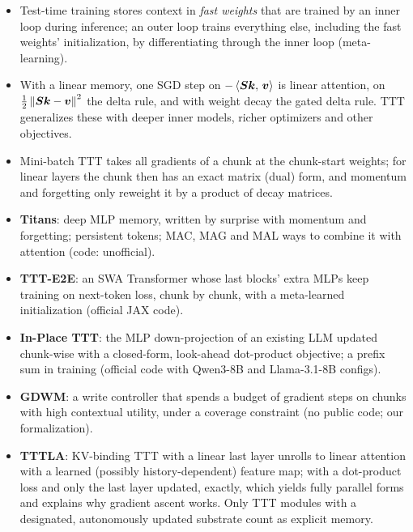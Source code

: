 \begin{summarybox}
\begin{itemize}
  \item Test-time training stores context in \emph{fast weights} that are trained by an inner
        loop during inference; an outer loop trains everything else, including the fast weights'
        initialization, by differentiating through the inner loop (meta-learning).
  \item With a linear memory, one SGD step on $-\left\langle \bm{S}\bm{k},\, \bm{v}\right\rangle$ is linear attention, on
        $\frac12\left\lVert \bm{S}\bm{k}-\bm{v}\right\rVert^2$ the delta rule, and with weight decay the gated delta rule.
        TTT generalizes these with deeper inner models, richer optimizers and other objectives.
  \item Mini-batch TTT takes all gradients of a chunk at the chunk-start weights; for linear
        layers the chunk then has an exact matrix (dual) form, and momentum and forgetting only
        reweight it by a product of decay matrices.
  \item \textbf{Titans}: deep MLP memory, written by surprise with momentum and forgetting;
        persistent tokens; MAC, MAG and MAL ways to combine it with attention (code: unofficial).
  \item \textbf{TTT-E2E}: an SWA Transformer whose last blocks' extra MLPs keep training on
        next-token loss, chunk by chunk, with a meta-learned initialization (official JAX code).
  \item \textbf{In-Place TTT}: the MLP down-projection of an existing LLM updated chunk-wise with a
        closed-form, look-ahead dot-product objective; a prefix sum in training (official code
        with Qwen3-8B and Llama-3.1-8B configs).
  \item \textbf{GDWM}: a write controller that spends a budget of gradient steps on chunks with
        high contextual utility, under a coverage constraint (no public code; our formalization).
  \item \textbf{TTTLA}: KV-binding TTT with a linear last layer unrolls to linear attention with a
        learned (possibly history-dependent) feature map; with a dot-product loss and only the
        last layer updated, exactly, which yields fully parallel forms and explains why gradient
        ascent works. Only TTT modules with a designated, autonomously updated substrate count as
        explicit memory.
\end{itemize}
\end{summarybox}


